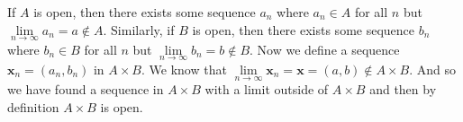 \documentclass[letterpaper]{article}
\begin{document}
\begin{enumerate}
\begin{enumerate}
\begin{enumerate}
      If $A$ is open, then there exists some sequence $a_n$ where $a_n\in A$ for all $n$ but $\lim\limits_{n\to\infty}a_n=a\not\in A$.
      Similarly, if $B$ is open, then there exists some sequence $b_n$ where $b_n\in B$ for all $n$ but $\lim\limits_{n\to\infty}b_n=b\not\in B$.
      Now we define a sequence $\boldsymbol{x}_n=(a_n,b_n)$ in $A\times B$.
      We know that $\lim\limits_{n\to\infty}\boldsymbol{x}_n=\boldsymbol{x}=(a,b)\not\in A\times B$.
      And so we have found a sequence in $A\times B$ with a limit outside of $A\times B$ and then by definition $A\times B$ is open.
    \end{enumerate}
  \end{enumerate}
\end{enumerate}
\end{document}
